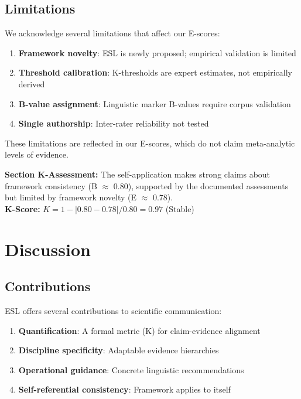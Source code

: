 \documentclass[11pt,a4paper]{article}
\begin{document}
\subsection{Limitations}

We acknowledge several limitations that affect our E-scores:

\begin{enumerate}
    \item \textbf{Framework novelty}: ESL is newly proposed; empirical
    validation is limited
    \item \textbf{Threshold calibration}: K-thresholds are expert
    estimates, not empirically derived
    \item \textbf{B-value assignment}: Linguistic marker B-values
    require corpus validation
    \item \textbf{Single authorship}: Inter-rater reliability not tested
\end{enumerate}

These limitations are reflected in our E-scores, which do not claim
meta-analytic levels of evidence.

\begin{eslbox}
\textbf{Section K-Assessment:} The self-application makes strong claims
about framework consistency (B $\approx$ 0.80), supported by the
documented assessments but limited by framework novelty (E $\approx$ 0.78). \\
\textbf{K-Score:} $K = 1 - |0.80 - 0.78| / 0.80 = 0.97$ (Stable)
\end{eslbox}

\section{Discussion}

\subsection{Contributions}

ESL offers several contributions to scientific communication:

\begin{enumerate}
    \item \textbf{Quantification}: A formal metric (K) for claim-evidence
    alignment
    \item \textbf{Discipline specificity}: Adaptable evidence hierarchies
    \item \textbf{Operational guidance}: Concrete linguistic recommendations
    \item \textbf{Self-referential consistency}: Framework applies to itself
\end{enumerate}
\end{document}
